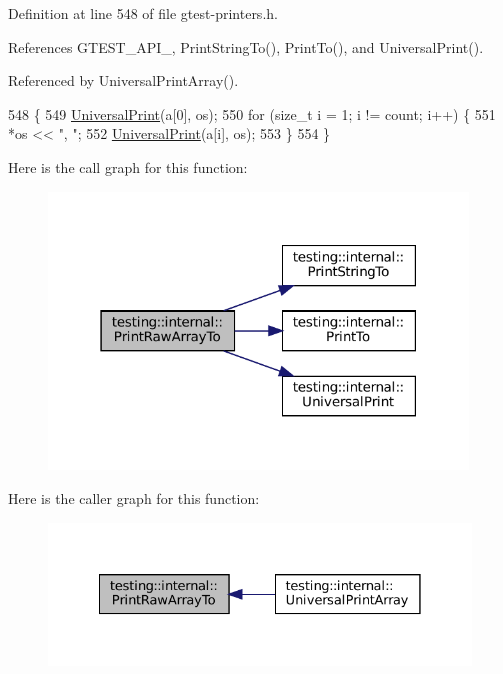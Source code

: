 Definition at line 548 of file gtest-\/printers.\+h.



References G\+T\+E\+S\+T\+\_\+\+A\+P\+I\+\_\+, Print\+String\+To(), Print\+To(), and Universal\+Print().



Referenced by Universal\+Print\+Array().


\begin{DoxyCode}
548                                                                 \{
549   \hyperlink{namespacetesting_1_1internal_a30708fa2bacf11895b03bdb21eb72309}{UniversalPrint}(a[0], os);
550   \textcolor{keywordflow}{for} (\textcolor{keywordtype}{size\_t} i = 1; i != count; i++) \{
551     *os << \textcolor{stringliteral}{", "};
552     \hyperlink{namespacetesting_1_1internal_a30708fa2bacf11895b03bdb21eb72309}{UniversalPrint}(a[i], os);
553   \}
554 \}
\end{DoxyCode}
Here is the call graph for this function\+:
\nopagebreak
\begin{figure}[H]
\begin{center}
\leavevmode
\includegraphics[width=316pt]{namespacetesting_1_1internal_ad3013b6b4c825edee9fe18ff1d982faa_cgraph}
\end{center}
\end{figure}
Here is the caller graph for this function\+:
\nopagebreak
\begin{figure}[H]
\begin{center}
\leavevmode
\includegraphics[width=328pt]{namespacetesting_1_1internal_ad3013b6b4c825edee9fe18ff1d982faa_icgraph}
\end{center}
\end{figure}
\mbox{\label{namespacetesting_1_1internal_ad609167d8d6792b0fb186539e0e159bd}} 

